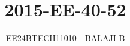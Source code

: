 \documentclass[journal]{IEEEtran}
\begin{document}

\vspace{3cm}

\title{2015-EE-40-52}
\author{EE24BTECH11010 - BALAJI B}
{\let\newpage\relax\maketitle}

\renewcommand{\thefigure}{\theenumi}
\renewcommand{\thetable}{\theenumi}
\setlength{\intextsep}{10pt} %


\renewcommand{\thetable}{\theenumi}
\end{document}

